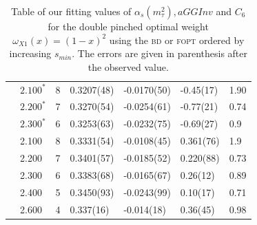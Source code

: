 \documentclass[../../index.tex]{subfiles}
\begin{document}
\begin{table}
\begin{tabular}{lllllll}
    \parbox[t]{2mm}{} & \(2.100^*\) & 8 & 0.3207(48) & -0.0170(50) & -0.45(17) & 1.90 \\
    & \(2.200^*\) & 7 & 0.3270(54) & -0.0254(61) & -0.77(21) & 0.74 \\
    & \(2.300^*\) & 6 & 0.3253(63) & -0.0232(75) & -0.69(27) & 0.9  \\
    \midrule
    \parbox[t]{2mm}{} & 2.100 & 8 & 0.3331(54) & -0.0108(45) & 0.361(76) & 1.9 \\
    & 2.200 & 7  & 0.3401(57) & -0.0185(52) & 0.220(88) & 0.73 \\
    & 2.300 & 6  & 0.3383(68) & -0.0165(67) & 0.26(12) & 0.89 \\
    & 2.400 & 5  & 0.3450(93) & -0.0243(99) & 0.10(17) & 0.71 \\
    & 2.600 & 4  & 0.337(16) & -0.014(18) & 0.36(45) & 0.98 \\
    \bottomrule
  \end{tabular}
  \caption{Table of our fitting values of \(\alpha_s(m_\tau^2), aGGInv\) and
    \(C_{6}\) for the double pinched optimal weight \(\omega_{X1}(x)=(1-x)^2\)
    using the \textsc{bd} or \textsc{fopt} ordered by increasing \(s_{min}\). The errors are given
    in parenthesis after the observed value.}
  \label{table:fitOpt30AlD4D6}
\end{table}
\end{document}
